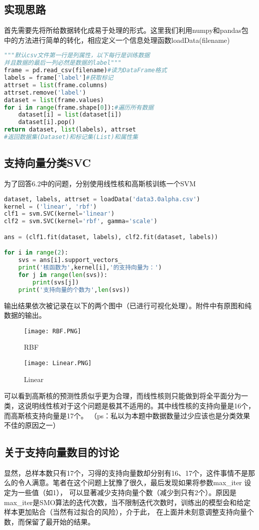 \documentclass[UTF8]{ctexart}
\begin{document}
\subsection{实现思路}
首先需要先将所给数据转化成易于处理的形式。这里我们利用numpy和pandas包中的方法进行简单的转化，相应定义一个信息处理函数loadData(filename)
\begin{lstlisting}[language = python]
"""默认csv文件第一行是列属性，以下每行是训练数据
并且数据的最后一列必然是数据的label"""
frame = pd.read_csv(filename)#读为DataFrame格式
labels = frame['label']#获取标记
attrset = list(frame.columns)
attrset.remove('label')
dataset = list(frame.values)
for i in range(frame.shape[0]):#遍历所有数据
	dataset[i] = list(dataset[i])
	dataset[i].pop()
return dataset, list(labels), attrset
#返回数据集(Dataset)和标记集(List)和属性集
\end{lstlisting}

\subsection{支持向量分类SVC}
为了回答6.2中的问题，分别使用线性核和高斯核训练一个SVM
\begin{lstlisting}[language=python]
dataset, labels, attrset = loadData('data3.0alpha.csv')
kernel = ('linear', 'rbf')
clf1 = svm.SVC(kernel='linear')
clf2 = svm.SVC(kernel='rbf', gamma='scale')

ans = (clf1.fit(dataset, labels), clf2.fit(dataset, labels))

for i in range(2):
	svs = ans[i].support_vectors_
	print('核函数为',kernel[i],'的支持向量为：')
	for j in range(len(svs)):
		print(svs[j])
	print('支持向量的个数为',len(svs))
\end{lstlisting}

输出结果依次被记录在以下的两个图中（已进行可视化处理）。附件中有原图和纯数据的输出。

\begin{figure}[htbp]
	\centering
	\texttt{[image: RBF.PNG]}
	\caption{RBF}
\end{figure}
\begin{figure}[htbp]
	\centering
	\texttt{[image: Linear.PNG]}
	\caption{Linear}
\end{figure}

可以看到高斯核的预测性质似乎更为合理，而线性核则只能做到将全平面分为一类，这说明线性核对于这个问题是极其不适用的。其中线性核的支持向量是16个，而高斯核支持向量是17个。
（ps：私以为本题中数据数量过少应该也是分类效果不佳的原因之一）
\subsection{关于支持向量数目的讨论}
显然，总样本数只有17个，习得的支持向量数却分别有16、17个，这件事情不是那么的令人满意。笔者在这个问题上犹豫了很久，最后发现如果将参数max\_iter 设定为一些值（如1），
可以显著减少支持向量个数（减少到只有2个）。原因是max\_iter是SMO算法的迭代次数，当不限制迭代次数时，训练出的模型会和给定样本更加贴合（当然有过拟合的风险），介于此，
在上面并未刻意调整支持向量个数，而保留了最开始的结果。
\end{document}
